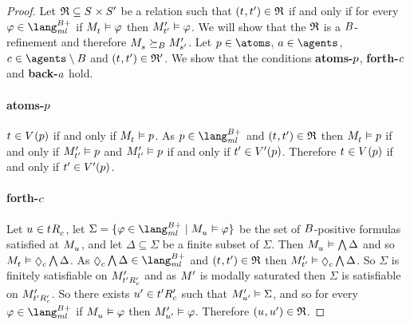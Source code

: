 \begin{proof}
Let $\refinement \subseteq \kStates \times \kStatesP$ be a relation such that $(\kStateT, \kStateTP) \in \refinement$ if and only if for every $\phi \in \langMlPlusBs$ if $\kPModel{\kStateT} \entails \phi$ then ${M^{\prime}_{{t}^{\prime}}} \vDash \varphi$.
We will show that the $\mathfrak{R}$ is a $B$-refinement and therefore $\kPModel{\kStateS} \simulatesBs \kPModelP{\kStateSP}$.
Let $\atomP \in \atoms$, $\agentA \in \agents$, $\agentC \in \agents \setminus \agentsB$ and $(\kStateT, \kStateTP) \in \refinement'$.
We show that the conditions {\bf atoms-$p$}, {\bf forth-$c$} and {\bf back-$a$} hold.

\paragraph{atoms-$p$}
$\kStateT \in \kValuation(\atomP)$ if and only if $\kPModel{\kStateT} \entails \atomP$.
As $\atomP \in \langMlPlusBs$ and $(\kStateT, \kStateTP) \in \refinement$ then $\kPModel{\kStateT} \entails \atomP$ if and only if ${M^{\prime}_{{t}^{\prime}}} \vDash p$
and ${M^{\prime}_{{t}^{\prime}}} \vDash p$ if and only if ${t}^{\prime} \in {V^{\prime}}(p)$.
Therefore $\kStateT \in \kValuation(\atomP)$ if and only if ${t}^{\prime} \in {V^{\prime}}(p)$.

\paragraph{forth-$c$}
Let $\kStateU \in \kSuccessorsC{\kStateT}$, let $\Sigma = \{\phi \in \langMlPlusBs \mid \kPModel{\kStateU} \entails \phi\}$ be the set of $B$-positive formulas satisfied at $\kPModel{\kStateU}$, and let $\Delta \subseteq \Sigma$ be a finite subset of $\Sigma$.
Then $\kPModel{\kStateU} \entails \bigwedge \Delta$ and so $\kPModel{\kStateT} \entails \possibleC \bigwedge \Delta$.
As $\possibleC \bigwedge \Delta \in \langMlPlusBs$ and $(\kStateT, \kStateTP) \in \refinement$ then $\kPModelP{\kStateTP} \entails \possibleC \bigwedge \Delta$.
So $\Sigma$ is finitely satisfiable on ${M^{\prime}_{{{t}^{\prime}} {R^{\prime}_{c}}}}$ and as ${M^{\prime}_{}}$ is modally saturated then $\Sigma$ is satisfiable on ${M^{\prime}_{{{t}^{\prime}} {R^{\prime}_{c}}}}$.
So there exists ${u}^{\prime} \in {{t}^{\prime}} {R^{\prime}_{c}}$ such that ${M^{\prime}_{{u}^{\prime}}} \vDash \Sigma$, and so for every $\phi \in \langMlPlusBs$ if $\kPModel{\kStateU} \entails \phi$ then ${M^{\prime}_{{u}^{\prime}}} \vDash \varphi$.
Therefore $(\kStateU, \kStateUP) \in \refinement$.


\end{proof}
